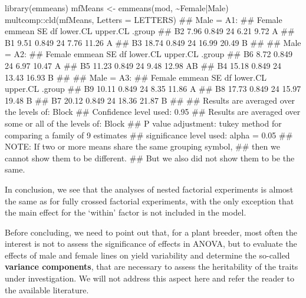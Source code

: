 \documentclass[a4paper,12pt,oneside]{book}
\newenvironment{Shaded}{\begin{snugshade}}{\end{snugshade}}
\newcommand{\SpecialCharTok}[1]{#1}
\newcommand{\DocumentationTok}[1]{#1}
\newcommand{\OtherTok}[1]{#1}
\newcommand{\FunctionTok}[1]{#1}
\newcommand{\AttributeTok}[1]{#1}
\newcommand{\AlertTok}[1]{#1}
\newcommand{\NormalTok}[1]{#1}
\begin{document}
\begin{Shaded}
\begin{Highlighting}[]
\FunctionTok{library}\NormalTok{(emmeans)}
\NormalTok{mfMeans }\OtherTok{\textless{}{-}} \FunctionTok{emmeans}\NormalTok{(mod, }\SpecialCharTok{\textasciitilde{}}\NormalTok{Female}\SpecialCharTok{|}\NormalTok{Male)}
\NormalTok{multcomp}\SpecialCharTok{::}\FunctionTok{cld}\NormalTok{(mfMeans, }\AttributeTok{Letters =}\NormalTok{ LETTERS)}
\DocumentationTok{\#\# Male = A1:}
\DocumentationTok{\#\#  Female emmean    SE df lower.CL upper.CL .group}
\DocumentationTok{\#\#  B2       7.96 0.849 24     6.21     9.72  A    }
\DocumentationTok{\#\#  B1       9.51 0.849 24     7.76    11.26  A    }
\DocumentationTok{\#\#  B3      18.74 0.849 24    16.99    20.49   B   }
\DocumentationTok{\#\# }
\DocumentationTok{\#\# Male = A2:}
\DocumentationTok{\#\#  Female emmean    SE df lower.CL upper.CL .group}
\DocumentationTok{\#\#  B6       8.72 0.849 24     6.97    10.47  A    }
\DocumentationTok{\#\#  B5      11.23 0.849 24     9.48    12.98  AB   }
\DocumentationTok{\#\#  B4      15.18 0.849 24    13.43    16.93   B   }
\DocumentationTok{\#\# }
\DocumentationTok{\#\# Male = A3:}
\DocumentationTok{\#\#  Female emmean    SE df lower.CL upper.CL .group}
\DocumentationTok{\#\#  B9      10.11 0.849 24     8.35    11.86  A    }
\DocumentationTok{\#\#  B8      17.73 0.849 24    15.97    19.48   B   }
\DocumentationTok{\#\#  B7      20.12 0.849 24    18.36    21.87   B   }
\DocumentationTok{\#\# }
\DocumentationTok{\#\# Results are averaged over the levels of: Block }
\DocumentationTok{\#\# Confidence level used: 0.95 }
\DocumentationTok{\#\# Results are averaged over some or all of the levels of: Block }
\DocumentationTok{\#\# P value adjustment: tukey method for comparing a family of 9 estimates }
\DocumentationTok{\#\# significance level used: alpha = 0.05 }
\DocumentationTok{\#\# }\AlertTok{NOTE}\DocumentationTok{: If two or more means share the same grouping symbol,}
\DocumentationTok{\#\#       then we cannot show them to be different.}
\DocumentationTok{\#\#       But we also did not show them to be the same.}
\end{Highlighting}
\end{Shaded}

In conclusion, we see that the analyses of nested factorial experiments is almost the same as for fully crossed factorial experiments, with the only exception that the main effect for the `within' factor is not included in the model.

Before concluding, we need to point out that, for a plant breeder, most often the interest is not to assess the significance of effects in ANOVA, but to evaluate the effects of male and female lines on yield variability and determine the so-called \textbf{variance components}, that are necessary to assess the heritability of the traits under investigation. We will not address this aspect here and refer the reader to the available literature.
\end{document}
